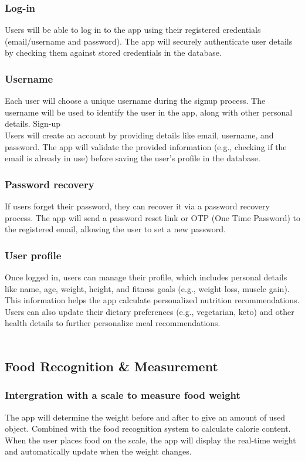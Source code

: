 \documentclass[conference]{IEEEtran}
\begin{document}
\subsubsection{Log-in}
Users will be able to log in to the app using their registered credentials (email/username and password). The app will securely authenticate user details by checking them against stored credentials in the database.\\

\subsubsection{Username}
Each user will choose a unique username during the signup process. The username will be used to identify the user in the app, along with other personal details.
Sign-up\\
Users will create an account by providing details like email, username, and password. The app will validate the provided information (e.g., checking if the email is already in use) before saving the user’s profile in the database.\\

\subsubsection{Password recovery}
If users forget their password, they can recover it via a password recovery process. The app will send a password reset link or OTP (One Time Password) to the registered email, allowing the user to set a new password.\\

\subsubsection{User profile}
Once logged in, users can manage their profile, which includes personal details like name, age, weight, height, and fitness goals (e.g., weight loss, muscle gain). This information helps the app calculate personalized nutrition recommendations.
Users can also update their dietary preferences (e.g., vegetarian, keto) and other health details to further personalize meal recommendations.\\\\

\subsection{Food Recognition \& Measurement}
\subsubsection{Intergration with a scale to measure food weight}
The app will determine the weight before and after to give an amount of used object. Combined with the food recognition system to calculate calorie content.
When the user places food on the scale, the app will display the real-time weight and automatically update when the weight changes.\\
\end{document}
